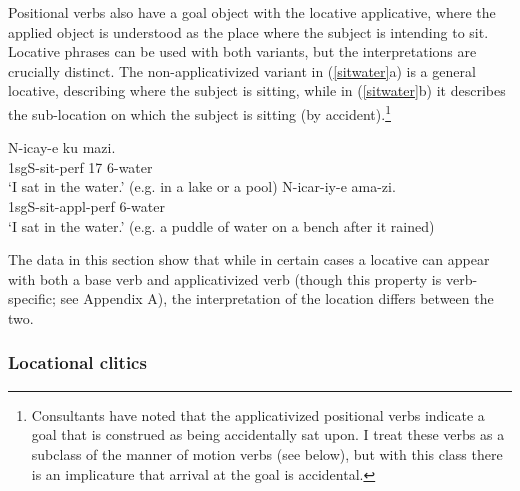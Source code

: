 \documentclass[output=paper]{langsci/langscibook}
\begin{document}
\fi

 Positional verbs also have a {\sc goal} object with the locative applicative, where the applied object is understood as the place where the subject is intending to sit.  Locative phrases can be used with both variants, but the interpretations are crucially distinct. The non-applicativized variant in (\ref{sitwater}a) is a general {\sc locative}, describing where the subject is sitting, while in (\ref{sitwater}b) it describes the sub-location on which the subject is sitting (by accident).\footnote{Consultants have noted that the applicativized positional verbs indicate a {\sc goal}  that is construed as being accidentally sat upon. I treat these verbs as a subclass of the manner of motion verbs (see below), but with this class there is an implicature that arrival at the {\sc goal}  is accidental.}
	\begin{exe}
		\ex\label{sitwater}\begin{xlist}
		\ex\gll N-icay-e ku mazi.\\
				1{\sc sgS-}sit-{\sc perf} 17 6-water\\
				\glt `I sat in the water.' (e.g. in a lake or a pool)
		\ex\gll N-icar-iy-e ama-zi.\\
				1{\sc sgS-}sit-{\sc appl-perf} 6-water\\
				\glt `I sat in the water.' (e.g. a puddle of water on a bench after it rained)
	\end{xlist}
	\end{exe}
%
The data in this section show that while in certain cases a locative can appear with both a base verb and applicativized verb (though this property is verb-specific; see Appendix A), the interpretation of the location differs between the two. 

\subsubsection{Locational clitics}%
\end{document}
